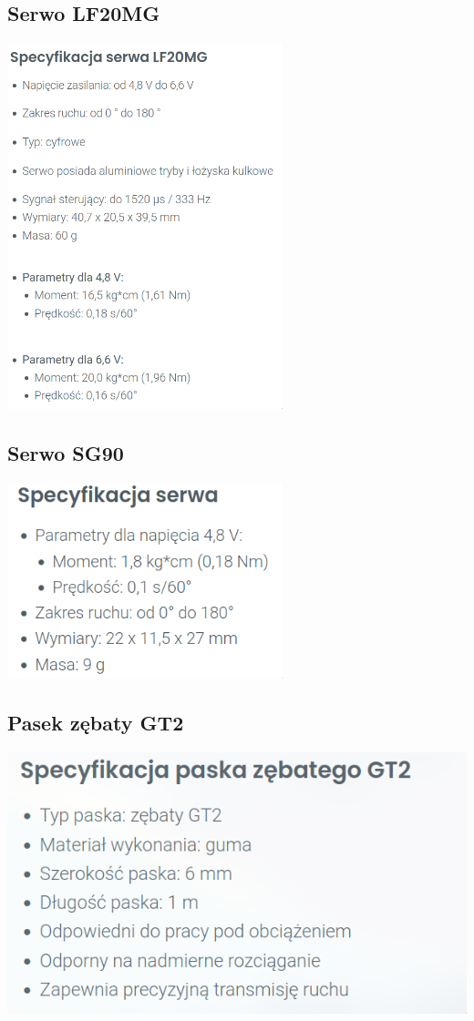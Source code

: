 \documentclass[a4paper,12pt, openany]{article}
\begin{document}
\subsection{Serwo LF20MG}
\includegraphics[width=0.6\textwidth]{serwolf.png}

\subsection{Serwo SG90}
\includegraphics[width=0.6\textwidth]{serwosg.png}

\subsection{Pasek zębaty GT2}
\includegraphics[width=\textwidth]{pasek.png}
\end{document}
